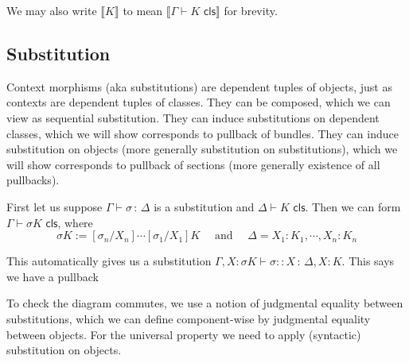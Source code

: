 \message{ !name(LF+Equality_LCCC.tex)}\documentclass{article}
\newcommand{\bbrkt}[1]{\llbracket #1 \rrbracket}
\newcommand{\Subst}[3]{[#1 / #2] #3}
\newcommand{\CtxExt}[3]{#1,#2 : #3}
\newcommand{\ClsJdg}[2]{#1 \vdash #2 \,\, \mathsf{cls}}
\newcommand{\ObjJdg}[3]{#1 \vdash #2 \, : \, #3 }
\newcommand{\<}{\langle}
\renewcommand{\>}{\rangle}
\newcommand{\si}{\sigma}
\newcommand{\Ga}{\Gamma}
\newcommand{\De}{\Delta}
\theoremstyle{definitionstyle}
\theoremstyle{exercisestyle}
\theoremstyle{remarkstyle}
\newenvironment{cd}{
    \begin{figure}[H]
    \centering
    \begin{tikzcd}
}{
    \end{tikzcd}
    \end{figure}
}
\begin{document}
We may also write $\bbrkt{K}$ to mean $\bbrkt{\ClsJdg{\Ga}{K}}$ for brevity.

\subsection{Substitution}

Context morphisms (aka substitutions) are dependent tuples of objects,
just as contexts are dependent tuples of classes.
They can be {\color{semantics} composed}, which we can view as {\color{syntax} sequential substitution}.
They can induce {\color{syntax} substitutions on dependent classes},
which we will show corresponds to {\color{semantics} pullback of bundles}.
They can induce {\color{syntax} substitution on objects} (more generally {\color{syntax} substitution on substitutions}),
which we will show corresponds to {\color{semantics} pullback of sections}
(more generally {\color{semantics} existence of all pullbacks}).

First let us suppose $\ObjJdg{\Ga}{\si}{\De}$ is a substitution and $\ClsJdg{\De}{K}$.
Then we can form $\ClsJdg{\Ga}{\si K}$,
where
\[ \si K := \Subst{\si_{n}}{X_{n}}{ \cdots \Subst{\si_{1}}{X_{1}}{K}} \quad \text{ and }
  \quad \De = \CtxExt{X_{1}:K_{1}}{\cdots, X_{n}}{K_{n}}\]

This automatically gives us a substitution $\ObjJdg{\CtxExt{\Ga}{X}{\si K}}{\si :: X}{{\CtxExt{\De}{X}{K}}}$.
This says we have a pullback


To check the diagram commutes, we use a notion of judgmental equality between substitutions,
which we can define component-wise by judgmental equality between objects.
For the universal property we need to apply (syntactic) substitution on objects.
\end{document}
